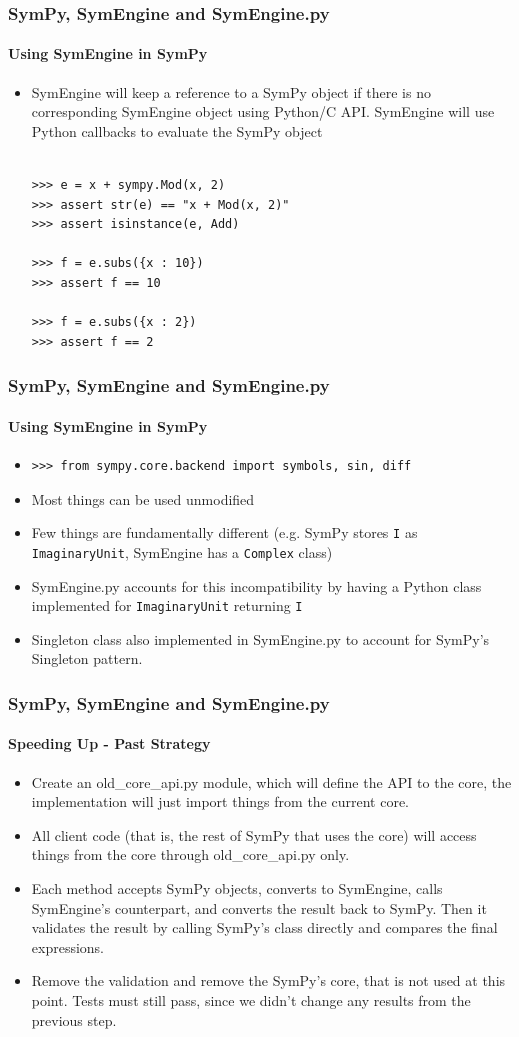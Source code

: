 \documentclass{beamer}
\begin{document}
\begin{frame}[fragile]
\frametitle{SymPy, SymEngine and SymEngine.py}
\framesubtitle{Using SymEngine in SymPy}
\begin{itemize}
\item
SymEngine will keep a reference to a SymPy object if there is no corresponding SymEngine object using Python/C API.
SymEngine will use Python callbacks to evaluate the SymPy object

\begin{verbatim}

>>> e = x + sympy.Mod(x, 2)
>>> assert str(e) == "x + Mod(x, 2)"
>>> assert isinstance(e, Add)

>>> f = e.subs({x : 10})
>>> assert f == 10

>>> f = e.subs({x : 2})
>>> assert f == 2
\end{verbatim}
\end{itemize}
\end{frame}


\begin{frame}[fragile]
\frametitle{SymPy, SymEngine and SymEngine.py}
\framesubtitle{Using SymEngine in SymPy}
\begin{itemize}
\item
\begin{verbatim}
>>> from sympy.core.backend import symbols, sin, diff
\end{verbatim}
\item Most things can be used unmodified
\item Few things are fundamentally different (e.g. SymPy stores \texttt{I} as
    \texttt{ImaginaryUnit}, SymEngine has a \texttt{Complex} class)
\item SymEngine.py accounts for this incompatibility by having a Python class
    implemented for \texttt{ImaginaryUnit} returning \texttt{I}
\item Singleton class also implemented in SymEngine.py to account for SymPy's
    Singleton pattern.
\end{itemize}
\end{frame}


\begin{frame}[fragile]
\frametitle{SymPy, SymEngine and SymEngine.py}
\framesubtitle{Speeding Up - Past Strategy}
\begin{itemize}
\item Create an old\_core\_api.py module, which will define the API to the core, the implementation will just import things from the current core.
\item All client code (that is, the rest of SymPy that uses the core) will access things from the core through old\_core\_api.py only.
\item Each method accepts SymPy objects, converts to SymEngine, calls SymEngine's counterpart, and converts the result back to SymPy. Then it validates the result by calling SymPy's class directly and compares the final expressions.
\item Remove the validation and remove the SymPy's core, that is not used at this point. Tests must still pass, since we didn't change any results from the previous step.
\end{itemize}
\end{frame}
\end{document}
